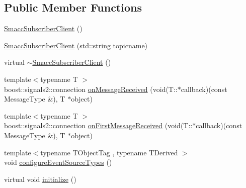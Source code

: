 \subsection*{Public Member Functions}
\begin{DoxyCompactItemize}
\item 
\hyperlink{classsmacc_1_1client__bases_1_1SmaccSubscriberClient_a9c3dd9981beb495a0646667acae06d73}{Smacc\+Subscriber\+Client} ()
\item 
\hyperlink{classsmacc_1_1client__bases_1_1SmaccSubscriberClient_a7e739a204fe5fe5b8cd7542758555e45}{Smacc\+Subscriber\+Client} (std\+::string topicname)
\item 
virtual \hyperlink{classsmacc_1_1client__bases_1_1SmaccSubscriberClient_a91b9206c97b4acc76d4202639d24a53b}{$\sim$\+Smacc\+Subscriber\+Client} ()
\item 
{\footnotesize template$<$typename T $>$ }\\boost\+::signals2\+::connection \hyperlink{classsmacc_1_1client__bases_1_1SmaccSubscriberClient_a4f02251e3a161fb6d802b154b1081f18}{on\+Message\+Received} (void(T\+::$\ast$callback)(const Message\+Type \&), T $\ast$object)
\item 
{\footnotesize template$<$typename T $>$ }\\boost\+::signals2\+::connection \hyperlink{classsmacc_1_1client__bases_1_1SmaccSubscriberClient_a3f6dc8ef86f21f401204182778cc584d}{on\+First\+Message\+Received} (void(T\+::$\ast$callback)(const Message\+Type \&), T $\ast$object)
\item 
{\footnotesize template$<$typename T\+Object\+Tag , typename T\+Derived $>$ }\\void \hyperlink{classsmacc_1_1client__bases_1_1SmaccSubscriberClient_adf0e61d4a0b34ecc76fb9f4c3d04ef97}{configure\+Event\+Source\+Types} ()
\item 
virtual void \hyperlink{classsmacc_1_1client__bases_1_1SmaccSubscriberClient_af188f0f5e89de26a07e1f964cdd23a70}{initialize} ()
\end{DoxyCompactItemize}
